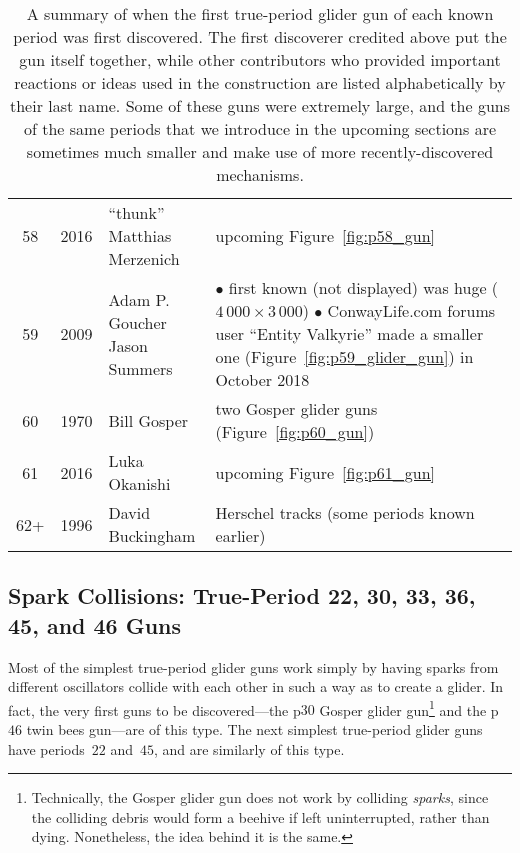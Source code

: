 \begin{table}[!htbp]
\begin{center}
\begin{tabular}{ccll}
			\rowcolor{gray!20} 58 & 2016 & \specialcelll[t]{``thunk'' \\ Matthias Merzenich} & upcoming Figure~\ref{fig:p58_gun} \\
			59 & 2009 & \specialcelll[t]{Adam P. Goucher \\ Jason Summers} & \specialcelll[t]{{\small$\bullet$} first known (not displayed) was huge (\rawtilde$4\,000 \times 3\,000$) \\ {\small$\bullet$} ConwayLife.com forums user ``Entity Valkyrie'' made \\ \hphantom{\small$\bullet$} a smaller one (Figure~\ref{fig:p59_glider_gun}) in October 2018} \\
			\rowcolor{gray!20} 60 & 1970 & Bill Gosper & two Gosper glider guns (Figure~\ref{fig:p60_gun}) \\
			61 & 2016 & Luka Okanishi & upcoming Figure~\ref{fig:p61_gun} \\
			\rowcolor{gray!20} 62+ & 1996 & David Buckingham & Herschel tracks (some periods known earlier) \\\bottomrule
		\end{tabular}
		\caption{A summary of when the first true-period glider gun of each known period was first discovered. The first discoverer credited above put the gun itself together, while other contributors who provided important reactions or ideas used in the construction are listed alphabetically by their last name. Some of these guns were extremely large, and the guns of the same periods that we introduce in the upcoming sections are sometimes much smaller and make use of more recently-discovered mechanisms.}\label{tab:true_period_glider_gun}
	\end{center}
\end{table}


\subsection{Spark Collisions: True-Period 22, 30, 33, 36, 45, and 46 Guns}\label{sec:true_period_spark}

Most of the simplest true-period glider guns work simply by having sparks from different oscillators collide with each other in such a way as to create a glider. In fact, the very first guns to be discovered---the p$30$ Gosper glider gun\footnote{Technically, the Gosper glider gun does not work by colliding \emph{sparks}, since the colliding debris would form a beehive if left uninterrupted, rather than dying. Nonetheless, the idea behind it is the same.} and the p$46$ twin bees gun---are of this type. The next simplest true-period glider guns have periods~$22$ and~$45$, and are similarly of this type.

